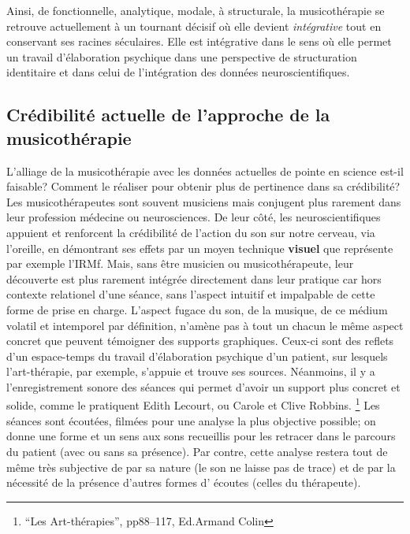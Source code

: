  Ainsi, de fonctionnelle, analytique, mo\-da\-le,  à 
struc\-tu\-rale, la musicothérapie se retrouve actuellement 
 à un tournant décisif où elle devient 
 \emph{intégrative} tout en conservant ses racines séculaires. Elle est 
intégrative dans le sens où elle permet un travail d'élaboration psychique dans une perspective de structuration identitaire \autocite[ch. III, p. 53, 
105]{vrait_musicotherapie_2018} et dans celui de l'intégration des données 
neuroscientifiques.
 


 
\subsection{Crédibilité actuelle de l'approche de la musicothérapie }


L'alliage de la musicothérapie avec les données actuelles de pointe en
science est-il faisable? Comment le réaliser pour obtenir plus de pertinence
dans sa crédibilité?
Les musicothérapeutes sont souvent musiciens mais conjugent plus
rarement dans leur profession
médecine ou neurosciences. De leur côté, les neuroscientifiques appuient
et renforcent la crédibilité de l'action du son sur notre cerveau, via
l'oreille, en démontrant ses effets par un moyen technique
\textbf{visuel} que représente par exemple l'IRMf. Mais, sans être musicien ou
musicothérapeute, leur découverte est plus rarement intégrée
directement dans leur pratique car hors contexte relationel d'une
séance, sans l'aspect intuitif et impalpable de cette forme de prise
en charge.
L'aspect fugace du son, de la musique, de ce médium volatil et
intemporel par
définition, n'amène pas à tout un chacun le
même aspect concret que peuvent témoigner des supports
graphiques. Ceux-ci sont des 
reflets d'un espace-temps du travail d'élaboration
psychique d'un patient, sur lesquels l'art-thérapie, par exemple, s'appuie et trouve
ses sources.
Néanmoins, il y a l'enregistrement sonore des séances qui 
permet d'avoir un support plus concret et solide, comme le pratiquent Edith Lecourt, ou Carole et Clive 
Robbins. \footnote{``Les Art-thérapies'', pp88--117, Ed.Armand Colin}
Les séances sont écoutées, filmées pour une
analyse la plus objective possible; on donne 
une forme et un sens aux sons recueillis pour les retracer dans le
parcours du patient (avec ou sans sa présence). Par contre, cette analyse  restera
tout de même très subjective de par sa nature (le son ne laisse pas
de trace) et de par la nécessité de la présence d'autres formes d'
écoutes (celles du thérapeute).



